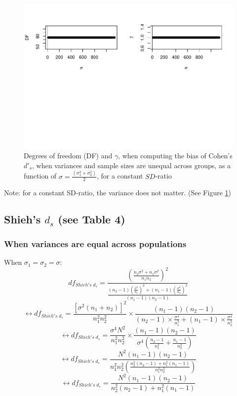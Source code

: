\documentclass[
  man]{apa6}
\begin{document}
\begin{figure}
\centering
\includegraphics{Theoretical-Bias-of-all-estimators-as-a-function-of-population-parameters_files/figure-latex/biascohendprimehetunbalvariance2-1.pdf}
\caption{\label{fig:biascohendprimehetunbalvariance2}Degrees of freedom (DF) and \(\gamma\), when computing the bias of Cohen's \(d'_s\), when variances and sample sizes are unequal across groups, as a function of \(\sigma= \frac{(\sigma_1^2+\sigma_2^2)}{2}\), for a constant \(SD\)-ratio}
\end{figure}

Note: for a constant SD-ratio, the variance does not matter. (See Figure \ref{fig:biascohendprimehetunbalvariance2})

\hypertarget{shiehs-d_s-see-table-4}{%
\subsection{\texorpdfstring{Shieh's \(d_s\) (see Table 4)}{Shieh's d\_s (see Table 4)}}\label{shiehs-d_s-see-table-4}}

\hypertarget{when-variances-are-equal-across-populations-1}{%
\subsubsection{When variances are equal across populations}\label{when-variances-are-equal-across-populations-1}}

When \(\sigma_1=\sigma_2=\sigma\):
\[df_{Shieh's \; d_s} = \frac{\left( \frac{n_2\sigma^2+n_1\sigma^2}{n_1n_2}\right)^2}{\frac{(n_2-1)\left( \frac{\sigma^2}{n_1}\right)^2+(n_1-1)\left( \frac{\sigma^2}{n_2}\right)^2}{(n_1-1)(n_2-1)}}\]
\[\leftrightarrow df_{Shieh's \; d_s} = \frac{[\sigma^2(n_1+n_2)]^2}{n_1^2n_2^2} \times \frac{(n_1-1)(n_2-1)}{(n_2-1) \times  \frac{\sigma^4}{n_1^2}+(n_1-1) \times \frac{\sigma^4}{n_2^2}}\]
\[\leftrightarrow df_{Shieh's \; d_s} = \frac{\sigma^4N^2}{n_1^2n_2^2} \times \frac{(n_1-1)(n_2-1)}{\sigma^4 \left( \frac{n_2-1}{n^2_1}+\frac{n_1-1}{n^2_2}\right) }\]
\[\leftrightarrow df_{Shieh's \; d_s} = \frac{N^2(n_1-1)(n_2-1)}{n_1^2n_2^2 \left( \frac{n_2^2(n_2-1)+n_1^2(n_1-1)}{n_1^2n_2^2}\right)}\]
\[\leftrightarrow df_{Shieh's \; d_s} = \frac{N^2(n_1-1)(n_2-1)}{n_2^2(n_2-1)+n_1^2(n_1-1)}\]
\end{document}
